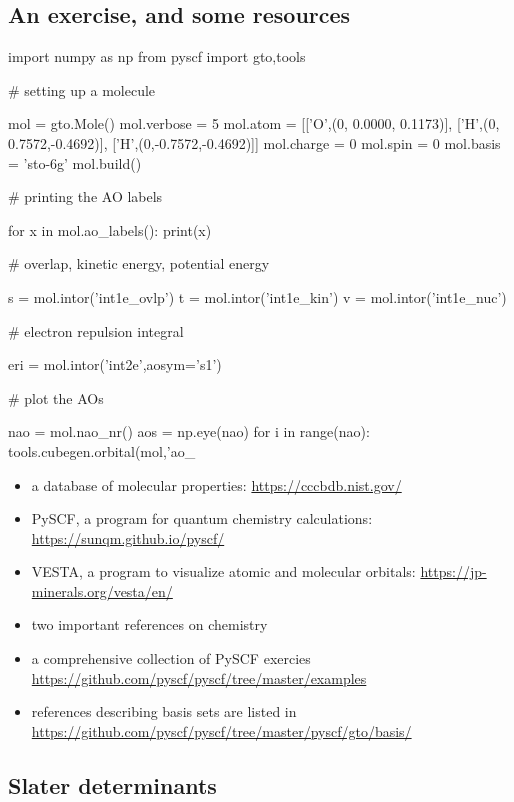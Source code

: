 \documentclass{article}
\begin{document}
\subsection{An exercise, and some resources}

\begin{python}
import numpy as np
from   pyscf import gto,tools

# setting up a molecule

mol         = gto.Mole()
mol.verbose = 5
mol.atom    = [['O',(0, 0.0000, 0.1173)],
               ['H',(0, 0.7572,-0.4692)],
               ['H',(0,-0.7572,-0.4692)]]
mol.charge  = 0
mol.spin    = 0
mol.basis   = 'sto-6g'
mol.build()

# printing the AO labels

for x in mol.ao_labels():
    print(x)

# overlap, kinetic energy, potential energy

s = mol.intor('int1e_ovlp')
t = mol.intor('int1e_kin')
v = mol.intor('int1e_nuc')

# electron repulsion integral

eri = mol.intor('int2e',aosym='s1')

# plot the AOs

nao = mol.nao_nr()
aos = np.eye(nao)
for i in range(nao):
    tools.cubegen.orbital(mol,'ao_%
\end{python}

\begin{itemize}
\item a database of molecular properties: {\small\url{https://cccbdb.nist.gov/}}
\item PySCF, a program for quantum chemistry calculations: {\small\url{https://sunqm.github.io/pyscf/}}
\item VESTA, a program to visualize atomic and molecular orbitals: {\small\url{https://jp-minerals.org/vesta/en/}}
\item two important references on chemistry \cite{szabo2012modern,helgaker2014molecular}
\item a comprehensive collection of PySCF exercies {\small\url{https://github.com/pyscf/pyscf/tree/master/examples}}
\item references describing basis sets are listed in {\small{\url{https://github.com/pyscf/pyscf/tree/master/pyscf/gto/basis/}}}
\end{itemize}

\subsection{Slater determinants}
\end{document}
